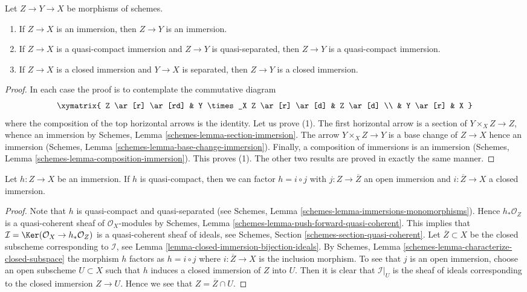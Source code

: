 \begin{lemma}
\label{lemma-immersion-permanence}
Let $Z \to Y \to X$ be morphisms of schemes.
\begin{enumerate}
\item If $Z \to X$ is an immersion, then $Z \to Y$ is an immersion.
\item If $Z \to X$ is a quasi-compact immersion and $Z \to Y$ is
quasi-separated, then $Z \to Y$ is a quasi-compact immersion.
\item If $Z \to X$ is a closed immersion and $Y \to X$ is separated,
then $Z \to Y$ is a closed immersion.
\end{enumerate}
\end{lemma}

\begin{proof}
In each case the proof is to contemplate the commutative diagram
$$
\xymatrix{
Z \ar[r] \ar[rd] & Y \times_X Z \ar[r] \ar[d] & Z \ar[d] \\
& Y \ar[r] & X
}
$$
where the composition of the top horizontal arrows is the identity.
Let us prove (1). The first horizontal arrow is a section of
$Y \times_X Z \to Z$, whence an immersion by
Schemes, Lemma \ref{schemes-lemma-section-immersion}.
The arrow $Y \times_X Z \to Y$ is a base change of $Z \to X$ hence
an immersion (Schemes, Lemma \ref{schemes-lemma-base-change-immersion}).
Finally, a composition of immersions is an immersion
(Schemes, Lemma \ref{schemes-lemma-composition-immersion}). This proves (1).
The other two results are proved in exactly the same manner.
\end{proof}

\begin{lemma}
\label{lemma-factor-quasi-compact-immersion}
Let $h : Z \to X$ be an immersion.
If $h$ is quasi-compact, then we can factor
$h = i \circ j$ with $j : Z \to \overline{Z}$ an
open immersion and $i : \overline{Z} \to X$ a closed immersion.
\end{lemma}

\begin{proof}
Note that $h$ is quasi-compact and quasi-separated (see
Schemes, Lemma \ref{schemes-lemma-immersions-monomorphisms}).
Hence $h_*\mathcal{O}_Z$ is a quasi-coherent sheaf of $\mathcal{O}_X$-modules
by Schemes, Lemma \ref{schemes-lemma-push-forward-quasi-coherent}.
This implies that
$\mathcal{I} = \Ker(\mathcal{O}_X \to h_*\mathcal{O}_Z)$
is a quasi-coherent sheaf of ideals, see
Schemes, Section \ref{schemes-section-quasi-coherent}.
Let $\overline{Z} \subset X$ be the closed subscheme corresponding
to $\mathcal{I}$, see Lemma \ref{lemma-closed-immersion-bijection-ideals}.
By Schemes, Lemma \ref{schemes-lemma-characterize-closed-subspace}
the morphism $h$ factors as
$h = i \circ j$ where $i : \overline{Z} \to X$ is the inclusion morphism.
To see that $j$ is an open immersion, choose an open subscheme
$U \subset X$ such that $h$ induces a closed immersion of $Z$
into $U$. Then it is clear that $\mathcal{I}|_U$ is the
sheaf of ideals corresponding to the closed immersion $Z \to U$.
Hence we see that $Z = \overline{Z} \cap U$.
\end{proof}

